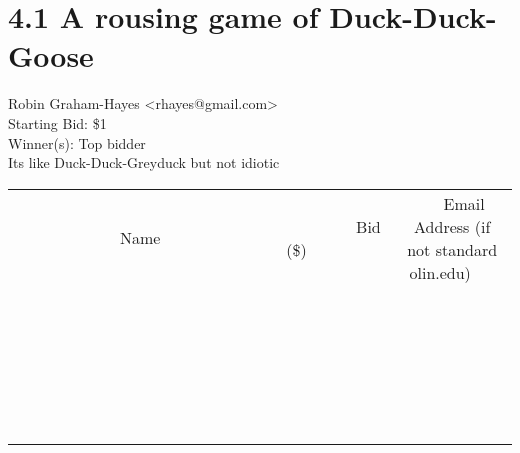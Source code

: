 \documentclass[11pt]{article}
\begin{document}
					\section*{4.1 A rousing game of Duck-Duck-Goose}
					Robin Graham-Hayes <rhayes@gmail.com> \\
					Starting Bid: \$1 \\
					Winner(s): Top bidder \\
					Its like Duck-Duck-Greyduck but not idiotic \\
					[6ex]
					\begin{tabular}{c c c}
						~~~~~~~~~~~~~Name~~~~~~~~~~~~~ & ~~~~~~~~~Bid (\$)~~~~~~~~~ & ~~~Email Address (if not standard olin.edu)~~~ \\
				
 & & \\
\hline
 & & \\
\hline
 & & \\
\hline
 & & \\
\hline
 & & \\
\hline
 & & \\
\hline
 & & \\
\hline
 & & \\
\hline
 & & \\
\hline
 & & \\
\hline
 & & \\
\hline
 & & \\
\hline
 & & \\
\hline
 & & \\
\hline
 & & \\
\hline
 & & \\
\hline
 & & \\
\hline
 & & \\
\hline
 & & \\
\hline
 & & \\
\hline
 & & \\
\hline
 & & \\
\hline
 & & \\
\hline
 & & \\
\hline
 & & \\
\hline
 & & \\
\hline
					\end{tabular}
					\clearpage
				
\end{document}

